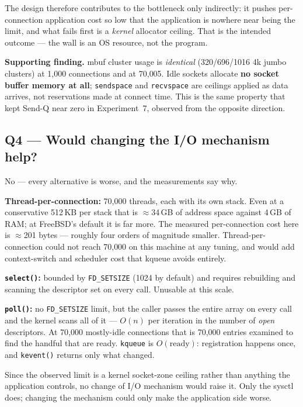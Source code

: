 \documentclass[11pt,a4paper]{article}
\newcommand{\cmd}[1]{\texttt{\small #1}}
\begin{document}
The design therefore contributes to the bottleneck only indirectly: it pushes
per-connection application cost so low that the application is nowhere near
being the limit, and what fails first is a \emph{kernel} allocator ceiling. That
is the intended outcome --- the wall is an OS resource, not the program.

\textbf{Supporting finding.} mbuf cluster usage is \emph{identical}
(320/696/1016 4k jumbo clusters) at 1{,}000 connections and at 70{,}005. Idle
sockets allocate \textbf{no socket buffer memory at all}; \cmd{sendspace} and
\cmd{recvspace} are ceilings applied as data arrives, not reservations made at
connect time. This is the same property that kept Send-Q near zero in
Experiment~7, observed from the opposite direction.

\subsection{Q4 --- Would changing the I/O mechanism help?}

No --- every alternative is worse, and the measurements say why.

\textbf{Thread-per-connection:} 70{,}000 threads, each with its own stack. Even
at a conservative 512\,KB per stack that is $\approx$34\,GB of address space
against 4\,GB of RAM; at FreeBSD's default it is far more. The measured
per-connection cost here is $\approx$201 bytes --- roughly four orders of
magnitude smaller. Thread-per-connection could not reach 70{,}000 on this
machine at any tuning, and would add context-switch and scheduler cost that
kqueue avoids entirely.

\textbf{\cmd{select()}:} bounded by \cmd{FD\_SETSIZE} (1024 by default) and
requires rebuilding and scanning the descriptor set on every call. Unusable at
this scale.

\textbf{\cmd{poll()}:} no \cmd{FD\_SETSIZE} limit, but the caller passes the
entire array on every call and the kernel scans all of it --- $O(n)$ per
iteration in the number of \emph{open} descriptors. At 70{,}000 mostly-idle
connections that is 70{,}000 entries examined to find the handful that are
ready. \cmd{kqueue} is $O(\mathrm{ready})$: registration happens once, and
\cmd{kevent()} returns only what changed.

Since the observed limit is a kernel socket-zone ceiling rather than anything
the application controls, no change of I/O mechanism would raise it. Only the
sysctl does; changing the mechanism could only make the application side worse.
\end{document}
